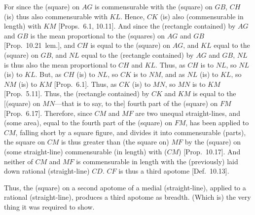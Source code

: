 \begin{Parallel}{}{}
{For since the (square) on $AG$ is commensurable with the (square) on 
$GB$, $CH$ (is) thus also commensurable with $KL$. Hence,
$CK$ (is) also  (commensurable in length) with $KM$ [Props.~6.1, 10.11]. 
And since the (rectangle contained) by $AG$ and $GB$ is the mean
proportional to the (squares) on $AG$ and $GB$ [Prop.~10.21~lem.], and $CH$
is equal to the (square) on $AG$, and $KL$ equal to the (square) on  $GB$,
and $NL$ equal to the (rectangle contained) by $AG$ and $GB$, $NL$ is
thus also the mean proportional to $CH$ and $KL$. Thus, as $CH$ is to
$NL$, so $NL$ (is) to $KL$. But, as $CH$ (is) to $NL$, so $CK$
is to $NM$, and as $NL$ (is) to $KL$, so $NM$ (is) to $KM$
[Prop.~6.1]. Thus, as $CK$ (is) to $MN$, so $MN$
is to $KM$ [Prop.~5.11]. Thus, the (rectangle contained) by $CK$ and $KM$
is equal to the [(square) on $MN$---that is to say, to the] fourth part of the
(square) on $FM$ [Prop.~6.17]. Therefore,
since $CM$ and $MF$ are two unequal straight-lines, and
(some area), equal to the fourth part of the (square) on  $FM$, has been
applied to $CM$, falling short by a square figure, and divides it into
commensurable (parts),  the square on $CM$ is thus greater than (the square on) $MF$ by the (square) on (some straight-line) commensurable
(in length) with ($CM$) [Prop.~10.17]. 
And neither of $CM$ and $MF$ is commensurable in length with the
(previously) laid down rational (straight-line) $CD$. $CF$ is thus a
third apotome [Def.~10.13].

Thus, the (square) on a second apotome of a medial
(straight-line), applied to a rational (straight-line), produces  a
third apotome as breadth. (Which is) the very thing it was required to show.}
\end{Parallel}

